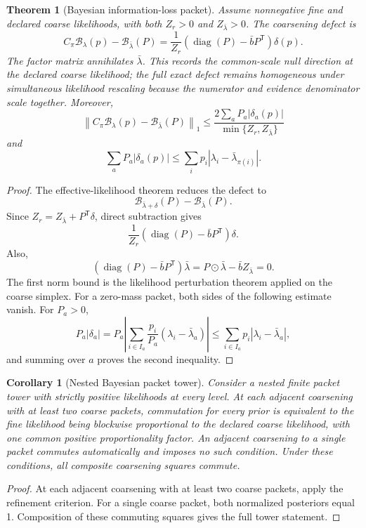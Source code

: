 \documentclass[11pt,letterpaper]{article}
\newtheorem{theorem}{Theorem}[section]
\theoremstyle{plain}
\theoremstyle{plain}
\theoremstyle{plain}
\newtheorem{corollary}[corollary]{Corollary}
\theoremstyle{definition}
\theoremstyle{definition}
\theoremstyle{definition}
\theoremstyle{definition}
\theoremstyle{definition}
\theoremstyle{remark}
\theoremstyle{remark}
\theoremstyle{remark}
\theoremstyle{remark}
\theoremstyle{remark}
\newcommand{\cB}{\mathcal B}
\newcommand{\diag}{\operatorname{diag}}
\theoremstyle{remark}
\let\KomorebiPrimitiveMathcal\mathcal
\renewcommand{\mathcal}[1]{{\KomorebiPrimitiveMathcal{#1}}}
\let\KomorebiPrimitivemathsf\mathsf
\renewcommand{\mathsf}[1]{{\KomorebiPrimitivemathsf{#1}}}
\begin{document}
\begin{theorem}[Bayesian information-loss packet]\label{core:record:023}
Assume nonnegative fine and declared coarse likelihoods, with both $Z_r>0$ and $Z_{\bar\lambda}>0$. The coarsening defect is
\[
\boxed{
C_\pi\cB_\lambda(p)
-
\cB_{\bar\lambda}(P)
=
\frac{1}{Z_r}
\left(\diag(P)-\bar bP^{\mathsf T}\right)
\delta(p).}
\]
The factor matrix annihilates $\bar\lambda$.  This records the common-scale null direction at the declared coarse likelihood; the full exact defect remains homogeneous under simultaneous likelihood rescaling because the numerator and evidence denominator scale together.  Moreover,
\[
\boxed{
\left\|C_\pi\cB_\lambda(p)-\cB_{\bar\lambda}(P)\right\|_1
\le
\frac{2\sum_aP_a|\delta_a(p)|}
{\min\{Z_r,Z_{\bar\lambda}\}}}
\]
and
\[
\sum_aP_a|\delta_a(p)|
\le
\sum_i p_i\left|\lambda_i-\bar\lambda_{\pi(i)}\right|.
\]
\end{theorem}

\begin{proof}
The effective-likelihood theorem reduces the defect to
\[
\cB_{\bar\lambda+\delta}(P)-\cB_{\bar\lambda}(P).
\]
Since $Z_r=Z_{\bar\lambda}+P^{\mathsf T}\delta$, direct subtraction gives
\[
\frac{1}{Z_r}
\left(\diag(P)-\bar bP^{\mathsf T}\right)\delta.
\]
Also,
\[
\left(\diag(P)-\bar bP^{\mathsf T}\right)\bar\lambda
=P\odot\bar\lambda-\bar bZ_{\bar\lambda}=0.
\]
The first norm bound is the likelihood perturbation theorem applied on the coarse simplex. For a zero-mass packet, both sides of the following estimate vanish. For $P_a>0$,
\[
P_a|\delta_a|
=
P_a\left|\sum_{i\in I_a}\frac{p_i}{P_a}
(\lambda_i-\bar\lambda_a)\right|
\le
\sum_{i\in I_a}p_i|\lambda_i-\bar\lambda_a|,
\]
and summing over $a$ proves the second inequality.
\end{proof}

\begin{corollary}[Nested Bayesian packet tower]\label{core:record:024}
Consider a nested finite packet tower with strictly positive likelihoods at every level. At each adjacent coarsening with at least two coarse packets, commutation for every prior is equivalent to the fine likelihood being blockwise proportional to the declared coarse likelihood, with one common positive proportionality factor. An adjacent coarsening to a single packet commutes automatically and imposes no such condition. Under these conditions, all composite coarsening squares commute.
\end{corollary}

\begin{proof}
At each adjacent coarsening with at least two coarse packets, apply the refinement criterion. For a single coarse packet, both normalized posteriors equal 1. Composition of these commuting squares gives the full tower statement.
\end{proof}
\end{document}

